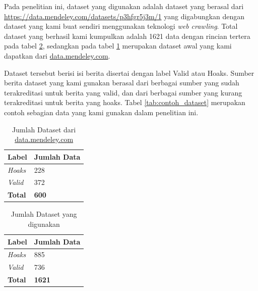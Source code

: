 Pada penelitian ini, dataset yang digunakan adalah dataset yang berasal dari \url{https://data.mendeley.com/datasets/p3hfgr5j3m/1} yang digabungkan dengan dataset yang kami buat sendiri menggunakan teknologi \textit{web crawling}. Total dataset yang berhasil kami kumpulkan adalah 1621 data dengan rincian tertera pada tabel \ref{tab:dataset}, sedangkan pada tabel \ref{tab:dataset_mendeley} merupakan dataset awal yang kami dapatkan dari \url{data.mendeley.com}.

Dataset tersebut berisi isi berita disertai dengan label Valid atau Hoaks. Sumber berita dataset yang kami gunakan berasal dari berbagai sumber yang sudah terakreditasi untuk berita yang valid, dan dari berbagai sumber yang kurang terakreditasi untuk berita yang hoaks. Tabel \ref{tab:contoh_dataset} merupakan contoh sebagian data yang kami gunakan dalam penelitian ini.

\begin{table}
    \caption{Jumlah Dataset dari \url{data.mendeley.com}}
    \label{tab:dataset_mendeley}
    \centering
    \begin{tabular}{ | l | l | }
        \hline
        \textbf{Label} & \textbf{Jumlah Data} \\ \hline
        \textit{Hoaks} & 228                  \\ \hline
        \textit{Valid} & 372                  \\ \hline
        \textbf{Total} & \textbf{600}         \\ \hline
    \end{tabular}
\end{table}

\begin{table}
    \caption{Jumlah Dataset yang digunakan}
    \label{tab:dataset}
    \centering
    \begin{tabular}{ | l | l | }
        \hline
        \textbf{Label} & \textbf{Jumlah Data} \\ \hline
        \textit{Hoaks} & 885                  \\ \hline
        \textit{Valid} & 736                  \\ \hline
        \textbf{Total} & \textbf{1621}        \\ \hline
    \end{tabular}
\end{table}


